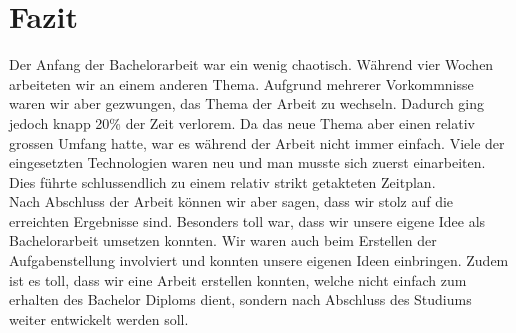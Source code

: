 \section{Fazit}
Der Anfang der Bachelorarbeit war ein wenig chaotisch. Während vier Wochen arbeiteten wir an einem anderen Thema. Aufgrund mehrerer Vorkommnisse waren wir aber gezwungen, das Thema der Arbeit zu wechseln. Dadurch ging jedoch knapp 20\% der Zeit verlorem. Da das neue Thema aber einen relativ grossen Umfang hatte, war es während der Arbeit nicht immer einfach. Viele der eingesetzten Technologien waren neu und man musste sich zuerst einarbeiten. Dies führte schlussendlich zu einem relativ strikt getakteten Zeitplan. \\

Nach Abschluss der Arbeit können wir aber sagen, dass wir stolz auf die erreichten Ergebnisse sind. Besonders toll war, dass wir unsere eigene Idee als Bachelorarbeit umsetzen konnten. Wir waren auch beim Erstellen der Aufgabenstellung involviert und konnten unsere eigenen Ideen einbringen. Zudem ist es toll, dass wir eine Arbeit erstellen konnten, welche nicht einfach zum erhalten des Bachelor Diploms dient, sondern nach Abschluss des Studiums weiter entwickelt werden soll.